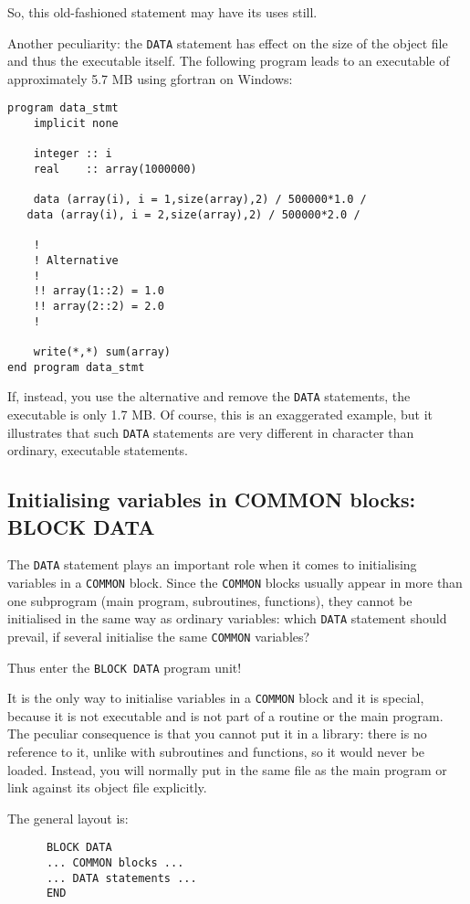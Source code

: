 So, this old-fashioned statement may have its uses still.

Another peculiarity: the \verb+DATA+ statement has effect on the
size of the object file and thus the executable itself. The following
program leads to an executable of approximately 5.7 MB using gfortran
on Windows:
\begin{verbatim}
program data_stmt
    implicit none

    integer :: i
    real    :: array(1000000)

    data (array(i), i = 1,size(array),2) / 500000*1.0 /
   data (array(i), i = 2,size(array),2) / 500000*2.0 /

    !
    ! Alternative
    !
    !! array(1::2) = 1.0
    !! array(2::2) = 2.0
    !

    write(*,*) sum(array)
end program data_stmt
\end{verbatim}

If, instead, you use the alternative and remove the \verb+DATA+
statements, the executable is only 1.7 MB. Of course, this is
an exaggerated example, but it illustrates that such \verb+DATA+
statements are very different in character than ordinary, executable
statements.


\subsection{Initialising variables in COMMON blocks: BLOCK DATA}
The \verb+DATA+ statement plays an important role when it comes to initialising
variables in a \verb+COMMON+ block. Since the \verb+COMMON+ blocks usually
appear in more than one subprogram (main program, subroutines, functions),
they cannot be initialised in the same way as ordinary variables: which
\verb+DATA+ statement should prevail, if several initialise the same
\verb+COMMON+ variables?

Thus enter the \verb+BLOCK DATA+ program unit!

It is the only way to initialise variables in a \verb+COMMON+ block and
it is special, because it is not executable and is not part of a routine
or the main program. The peculiar consequence is
that you cannot put it in a library: there is no reference to it, unlike
with subroutines and functions, so it would never be loaded. Instead, you
will normally put in the same file as the main program or link against
its object file explicitly.

The general layout is:
%
\begin{verbatim}
      BLOCK DATA
      ... COMMON blocks ...
      ... DATA statements ...
      END
\end{verbatim}

